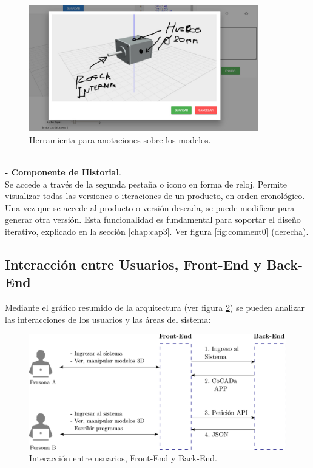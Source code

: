 \begin{itemize}
\begin{itemize}
\begin{figure}[h]
    \includegraphics[width=10cm]{Img/Desarrollo/comentario2.jpg}
    \centering
    \caption{\footnotesize{ Herramienta para anotaciones sobre los modelos. }}
    \label{fig:comment2}
\end{figure}

\\



\vspace{5mm}
\textbf{- Componente de Historial}.\\
Se accede a través de la segunda pestaña o icono en forma de reloj. Permite visualizar todas las versiones o iteraciones de un producto, en orden cronológico. Una vez que se accede al producto o versión deseada, se puede modificar para generar otra versión. Esta funcionalidad es fundamental para soportar el diseño iterativo, explicado en la sección \ref{chap:cap3}. Ver figura \ref{fig:comment0} (derecha).


\end{itemize}



\end{itemize}


\subsection{Interacción entre Usuarios, Front-End y Back-End}

Mediante el gráfico resumido de la  arquitectura (ver figura \ref{fig:front-backend}) se pueden analizar las interacciones de los usuarios y las áreas del sistema:

\begin{figure}[ht]
    \includegraphics[width=12cm]{Img/Desarrollo/front-back.png}
    \centering
    \caption{\footnotesize{ Interacción entre usuarios, Front-End y Back-End. }}
    \label{fig:front-backend}
\end{figure}


